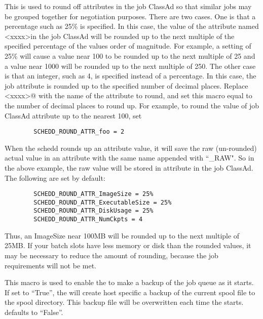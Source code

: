 \begin{description}
\label{param:ScheddRoundAttr}
\item[\Macro{SCHEDD\_ROUND\_ATTR\_<xxxx>}]
  This is used to round off attributes in
  the job ClassAd so that similar jobs may be grouped together for
  negotiation purposes.  There are two cases.  One is that a
  percentage such as 25\% is specified.  In this case, the value of
  the attribute named \verb@<xxxx>\@ in the job ClassAd will be
  rounded up to the next multiple of the specified percentage of the
  values order of magnitude.  For example, a setting of 25\% will
  cause a value near 100 to be rounded up to the next multiple of 25
  and a value near 1000 will be rounded up to the next multiple of
  250.  The other case is that an integer, such as 4, is specified
  instead of a percentage.  In this case, the job attribute is rounded
  up to the specified number of decimal places.
  Replace \verb@<xxxx>@ with the name of the attribute to round, and set this
  macro equal to the number of decimal places to round up.  For example, to
  round the value of job ClassAd attribute   up to the nearest
  100, set 
\begin{verbatim}
        SCHEDD_ROUND_ATTR_foo = 2
\end{verbatim}
  When the schedd rounds up an attribute value, it will save the raw 
  (un-rounded) actual value in an attribute with the same name appended
  with ``\_RAW".  So in the above example, the raw value will be stored
  in attribute  in the job ClassAd.
  The following are set by default:
\begin{verbatim}
        SCHEDD_ROUND_ATTR_ImageSize = 25%
        SCHEDD_ROUND_ATTR_ExecutableSize = 25%
        SCHEDD_ROUND_ATTR_DiskUsage = 25%
        SCHEDD_ROUND_ATTR_NumCkpts = 4
\end{verbatim}
  Thus, an ImageSize near 100MB will be rounded up to the next
  multiple of 25MB.  If your batch slots have less
  memory or disk than the rounded values, it may be necessary to
  reduce the amount of rounding, because the job requirements
  will not be met.

\label{param:ScheddBackupSpool}
\item[\Macro{SCHEDD\_BACKUP\_SPOOL}]
  This macro is used to enable the
   to make a backup of the job queue as it starts.  If
  set to ``True'', the  will create host specific a
  backup of the current spool file to the spool directory.  This
  backup file will be overwritten each time the 
  starts.   defaults to ``False''.


\end{description}
